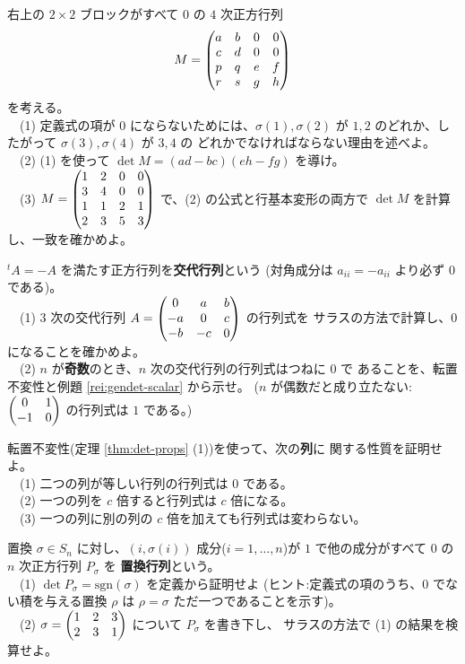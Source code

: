 \begin{mondai}[発展]\label{q:gendet-ex9}
右上の $2 \times 2$ ブロックがすべて $0$ の $4$ 次正方行列
\[
M = \begin{pmatrix}a & b & 0 & 0 \\ c & d & 0 & 0 \\ p & q & e & f \\ r & s & g & h\end{pmatrix}
\]
を考える。\\
　(1) 定義式の項が $0$ にならないためには、$\sigma(1), \sigma(2)$ が
$1, 2$ のどれか、したがって $\sigma(3), \sigma(4)$ が $3, 4$ の
どれかでなければならない理由を述べよ。\\
　(2) (1) を使って $\det M = (ad - bc)(eh - fg)$ を導け。\\
　(3) $M = \begin{pmatrix}1 & 2 & 0 & 0 \\ 3 & 4 & 0 & 0 \\ 1 & 1 & 2 & 1 \\ 2 & 3 & 5 & 3\end{pmatrix}$
で、(2) の公式と行基本変形の両方で $\det M$ を計算し、一致を確かめよ。
\end{mondai}

\begin{mondai}[発展]\label{q:gendet-ex10}
${}^t\!A = -A$ を満たす正方行列を\textbf{交代行列}という
(対角成分は $a_{ii} = -a_{ii}$ より必ず $0$ である)。\\
　(1) $3$ 次の交代行列
$A = \begin{pmatrix}0 & a & b \\ -a & 0 & c \\ -b & -c & 0\end{pmatrix}$ の行列式を
サラスの方法で計算し、$0$ になることを確かめよ。\\
　(2) $n$ が\textbf{奇数}のとき、$n$ 次の交代行列の行列式はつねに $0$ で
あることを、転置不変性と例題 \ref{rei:gendet-scalar} から示せ。
($n$ が偶数だと成り立たない:$\begin{pmatrix}0 & 1 \\ -1 & 0\end{pmatrix}$ の行列式は $1$ である。)
\end{mondai}

\begin{mondai}[証明]\label{q:gendet-ex11}
転置不変性(定理 \ref{thm:det-props} (1))を使って、次の\textbf{列}に
関する性質を証明せよ。\\
　(1) 二つの列が等しい行列の行列式は $0$ である。\\
　(2) 一つの列を $c$ 倍すると行列式は $c$ 倍になる。\\
　(3) 一つの列に別の列の $c$ 倍を加えても行列式は変わらない。
\end{mondai}

\begin{mondai}[証明]\label{q:gendet-ex12}
置換 $\sigma \in S_n$ に対し、$(i, \sigma(i))$ 成分($i = 1, \dots, n$)が
$1$ で他の成分がすべて $0$ の $n$ 次正方行列 $P_\sigma$ を
\textbf{置換行列}という。\\
　(1) $\det P_\sigma = \mathrm{sgn}(\sigma)$ を定義から証明せよ
(ヒント:定義式の項のうち、$0$ でない積を与える置換 $\rho$ は
$\rho = \sigma$ ただ一つであることを示す)。\\
　(2) $\sigma = \begin{pmatrix}1 & 2 & 3 \\ 2 & 3 & 1\end{pmatrix}$ について $P_\sigma$ を書き下し、
サラスの方法で (1) の結果を検算せよ。
\end{mondai}

